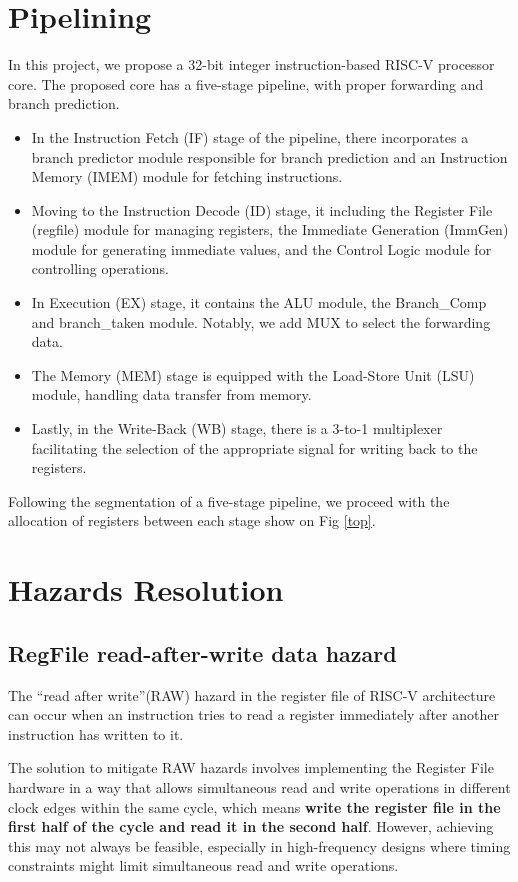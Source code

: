 \documentclass[12pt,a4paper,oneside]{book} %
\begin{document}
\section{Pipelining}
In this project, we propose a 32-bit integer instruction-based RISC-V processor core. The proposed core has a five-stage pipeline, with proper forwarding and branch prediction. 

\begin{itemize}
    \item In the Instruction Fetch (IF) stage of the pipeline, there incorporates a branch predictor module responsible for branch prediction and an Instruction Memory (IMEM) module for fetching instructions.
    \item Moving to the Instruction Decode (ID) stage, it including the Register File (regfile) module for managing registers, the Immediate Generation (ImmGen) module for generating immediate values, and the Control Logic module for controlling operations.
    \item In Execution (EX) stage, it contains the ALU module, the Branch\_Comp and branch\_taken module. Notably, we add MUX to select the forwarding data.
    \item The Memory (MEM) stage is equipped with the Load-Store Unit (LSU) module, handling data transfer from memory.
    \item Lastly, in the Write-Back (WB) stage, there is a 3-to-1 multiplexer facilitating the selection of the appropriate signal for writing back to the registers.
\end{itemize}

Following the segmentation of a five-stage pipeline, we proceed with the allocation of registers between each stage show on Fig \ref{top}.

\section{Hazards Resolution}
\subsection{RegFile read-after-write data hazard}
The ``read after write''(RAW) hazard in the register file of RISC-V architecture can occur when an instruction tries to read a register immediately after another instruction has written to it.

The solution to mitigate RAW hazards involves implementing the Register File hardware in a way that allows simultaneous read and write operations in different clock edges within the same cycle, which means \textbf{write the register file in the first half of the cycle and read it in the second half}. However, achieving this may not always be feasible, especially in high-frequency designs where timing constraints might limit simultaneous read and write operations.
\end{document}
